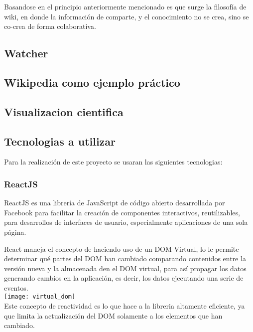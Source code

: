         Basandose en el principio anteriormente mencionado es que surge la filosofía de wiki, en donde la información de comparte, y el conocimiento no se crea, sino se co-crea de forma colaborativa.

    \subsection{Watcher}

    \subsection{Wikipedia como ejemplo práctico}

    \subsection{Visualizacion cientifica}


\subsection{Tecnologias a utilizar}

    Para la realización de este proyecto se usaran las siguientes tecnologias:

    \subsubsection{ReactJS}

        ReactJS es una librería de JavaScript de código abierto desarrollada por Facebook para facilitar la creación de componentes interactivos, reutilizables, para desarrollos de interfaces de usuario, especialmente aplicaciones de una sola página.

        React maneja el concepto de  haciendo uso de un DOM Virtual, lo le permite determinar qué partes del DOM han cambiado comparando contenidos entre la versión nueva y la almacenada den el DOM virtual, para así propagar los datos generando cambios en la aplicación, es decir, los datos  ejecutando una serie de eventos.\\

        \texttt{[image: virtual\_dom]}\\

        Este concepto de reactividad es lo que hace a la libreria altamente eficiente, ya que limita la actualización del DOM solamente a los elementos que han cambiado.
        
